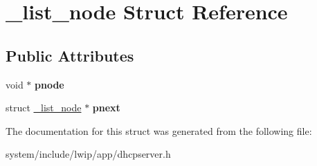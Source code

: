 \hypertarget{struct__list__node}{}\section{\+\_\+list\+\_\+node Struct Reference}
\label{struct__list__node}
\subsection*{Public Attributes}
\begin{DoxyCompactItemize}
\item 
\hypertarget{struct__list__node_abac609fd00cd84b4efdf5a8ea76c4c87}{}void $\ast$ {\bfseries pnode}\label{struct__list__node_abac609fd00cd84b4efdf5a8ea76c4c87}

\item 
\hypertarget{struct__list__node_acda57ef964a3931d3b80134409eb80c6}{}struct \hyperlink{struct__list__node}{\+\_\+list\+\_\+node} $\ast$ {\bfseries pnext}\label{struct__list__node_acda57ef964a3931d3b80134409eb80c6}

\end{DoxyCompactItemize}


The documentation for this struct was generated from the following file\+:\begin{DoxyCompactItemize}
\item 
system/include/lwip/app/dhcpserver.\+h\end{DoxyCompactItemize}

